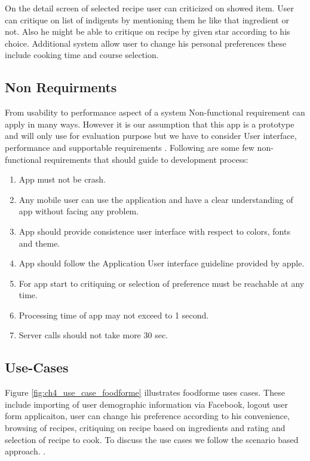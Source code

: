On the detail screen of selected recipe user can criticized on showed item. User can critique on list of indigents by mentioning them he like that ingredient or not. Also he might be able to critique on recipe by given star according to his choice. Additional system allow user to change his personal preferences these include cooking time and course selection. \newline


\subsection{Non Requirments}

From usability to performance aspect of a system Non-functional requirement can apply in many ways. However it is our assumption that this app is a prototype and will only use for evaluation purpose but we have to consider User interface, performance and supportable requirements \cite{burigat2005bringing}. Following are some few non-functional requirements that should guide to development process:

\begin{enumerate}

	\item App must not be crash.
	\item Any mobile user can use the application and have a clear understanding of app without facing any problem.
	\item App should provide consistence user interface with respect to colors, fonts and theme.
	\item App should follow the Application User interface guideline provided by apple.
	\item For app start to critiquing or selection of preference must be reachable at any time.
	\item Processing time of app may not exceed to 1 second. 
	\item Server calls should not take more 30 sec.

\end{enumerate}

\subsection{Use-Cases}

Figure \ref{fig:ch4_use_case_foodforme} illustrates foodforme uses cases.  These include importing of user demographic information via Facebook, logout user form applicaiton, user can change his preference according to his convenience, browsing of recipes, critiquing on recipe based on ingredients and rating and selection of recipe to cook. To discuss the use cases we follow the scenario based approach. \cite{bruegge2004object}.

